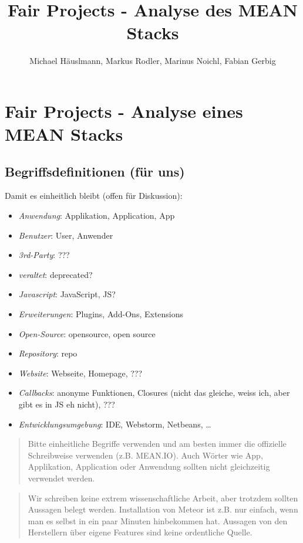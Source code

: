 \documentclass[]{article}
\date{}
\author{Michael Häuslmann, Markus Rodler, Marinus Noichl, Fabian Gerbig}
\title{Fair Projects - Analyse des MEAN Stacks}
\begin{document}
\maketitle
\newpage
\tableofcontents

\section{Fair Projects - Analyse eines MEAN
Stacks}\label{fair-projects---analyse-eines-mean-stacks}

\subsection{Begriffsdefinitionen (für
uns)}\label{begriffsdefinitionen-fuxfcr-uns}

Damit es einheitlich bleibt (offen für Diskussion):

\begin{itemize}
\itemsep1pt\parskip0pt
\item
  \emph{Anwendung}: Applikation, Application, App
\item
  \emph{Benutzer}: User, Anwender
\item
  \emph{3rd-Party}: ???
\item
  \emph{veraltet}: deprecated?
\item
  \emph{Javascript}: JavaScript, JS?
\item
  \emph{Erweiterungen}: Plugins, Add-Ons, Extensions
\item
  \emph{Open-Source}: opensource, open source
\item
  \emph{Repository}: repo
\item
  \emph{Website}: Webseite, Homepage, ???
\item
  \emph{Callbacks}: anonyme Funktionen, Closures (nicht das gleiche,
  weiss ich, aber gibt es in JS eh nicht), ???
\item
  \emph{Entwicklungsumgebung}: IDE, Webstorm, Netbeans, \ldots{}
\end{itemize}

\begin{quote}
Bitte einheitliche Begriffe verwenden und am besten immer die offizielle
Schreibweise verwenden (z.B. MEAN.IO). Auch Wörter wie App, Applikation,
Application oder Anwendung sollten nicht gleichzeitig verwendet werden.
\end{quote}

\begin{quote}
Wir schreiben keine extrem wissenschaftliche Arbeit, aber trotzdem
sollten Aussagen belegt werden. Installation von Meteor ist z.B. nur
einfach, wenn man es selbst in ein paar Minuten hinbekommen hat.
Aussagen von den Herstellern über eigene Features sind keine ordentliche
Quelle.
\end{quote}
\end{document}
